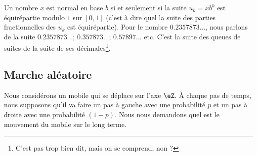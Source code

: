 Un nombre \( x\) est normal en base \( b\) si et seulement si la suite  \( u_k=xb^k\) est équirépartie modulo \( 1\) sur \( [0,1]\) (c'est à dire quel la suite des parties fractionnelles des \( u_k\) est équirépartie). Pour le nombre \( 0.2357873\ldots\), nous parlons de la suite \( 0.2357873\ldots\); \( 0.357873\ldots\); \( 0.57897\ldots\) etc. C'est la suite des queues de suites de la suite de ses décimales\footnote{C'est pas trop bien dit, mais on se comprend, non ?}.

\subsection{Marche aléatoire}

Nous considérons un mobile qui se déplace sur l'axe \( \eZ\). À chaque pas de temps, nous supposons qu'il va faire un pas à gauche avec une probabilité \( p\) et un pas à droite avec une probabilité \( (1-p)\). Nous nous demandons quel est le mouvement du mobile sur le long terme.

